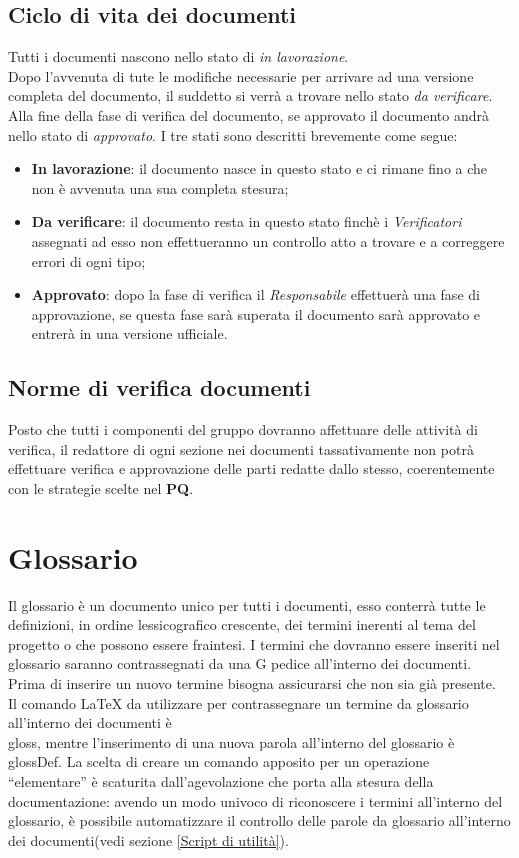 \documentclass{scalatekids-article}
\begin{document}
\subsection{Ciclo di vita dei documenti}
Tutti i documenti nascono nello stato di \textit{in lavorazione}.\\
Dopo l'avvenuta di tute le modifiche necessarie per arrivare ad una versione completa del documento, il suddetto si verrà a trovare nello stato \textit{da verificare}.\\
Alla fine della fase di verifica del documento, se approvato il documento andrà nello stato di \textit{approvato}.
I tre stati sono descritti brevemente come segue:
\begin{itemize}
\item \textbf{In lavorazione}: il documento nasce in questo stato e ci rimane fino a che non è avvenuta una sua completa stesura;
\item \textbf{Da verificare}: il documento resta in questo stato finchè i \textit{Verificatori} assegnati ad esso non effettueranno un controllo atto a trovare e a correggere errori di ogni tipo;
\item \textbf{Approvato}: dopo la fase di verifica il \textit{Responsabile} effettuerà una fase di approvazione, se questa fase sarà superata il documento sarà approvato e entrerà in una versione ufficiale.
\end{itemize}

\subsection{Norme di verifica documenti}
Posto che tutti i componenti del gruppo dovranno affettuare delle attività di
verifica, il redattore di ogni sezione nei documenti tassativamente non potrà
effettuare verifica e approvazione delle parti redatte dallo stesso,
coerentemente con le strategie scelte nel \textbf{PQ}.

\section{Glossario}
Il glossario è un documento unico per tutti i documenti, esso conterrà tutte le
definizioni, in ordine lessicografico crescente, dei termini inerenti al tema
del progetto o che possono essere fraintesi. I termini che dovranno essere
inseriti nel glossario saranno contrassegnati da una G pedice all'interno dei
documenti. Prima di inserire un nuovo termine bisogna assicurarsi che non sia
già presente.\\ Il comando \LaTeX\xspace da utilizzare per contrassegnare un
termine da glossario all'interno dei documenti è \\gloss, mentre l'inserimento
di una nuova parola all'interno del glossario è \\glossDef. La scelta di creare
un comando apposito per un operazione ``elementare'' è scaturita
dall'agevolazione che porta alla stesura della documentazione: avendo un modo
univoco di riconoscere i termini all'interno del glossario, è possibile
automatizzare il controllo delle parole da glossario all'interno dei
documenti(vedi sezione \ref{Script di utilità}).
\end{document}
